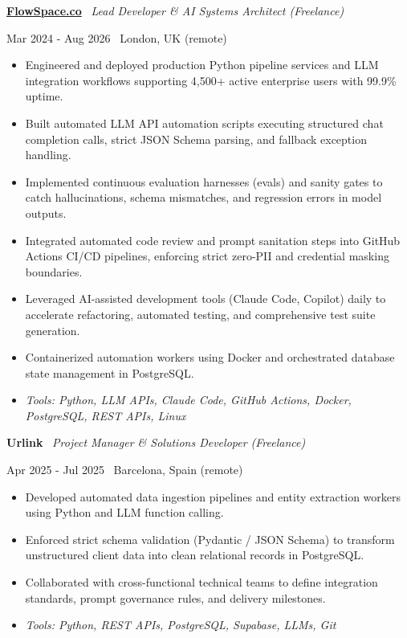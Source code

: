 \documentclass[a4paper,10pt]{article}
\newcommand{\role}[4]{%
  \vspace{2pt}\noindent
  \begin{minipage}[t]{0.70\textwidth}\raggedright\textbf{#1} \textbullet\ \textit{#3}\end{minipage}%
  \hfill
  \begin{minipage}[t]{0.28\textwidth}\raggedleft\footnotesize\color{gray}#2 \textbullet\ #4\end{minipage}%
  \vspace{1pt}%
}
\begin{document}
\role{\href{https://flowspace.co}{FlowSpace.co}}{Mar 2024 - Aug 2026}{Lead Developer \& AI Systems Architect (Freelance)}{London, UK (remote)}
\begin{itemize}
  \item Engineered and deployed production Python pipeline services and LLM integration workflows supporting 4,500+ active enterprise users with 99.9\% uptime.
  \item Built automated LLM API automation scripts executing structured chat completion calls, strict JSON Schema parsing, and fallback exception handling.
  \item Implemented continuous evaluation harnesses (evals) and sanity gates to catch hallucinations, schema mismatches, and regression errors in model outputs.
  \item Integrated automated code review and prompt sanitation steps into GitHub Actions CI/CD pipelines, enforcing strict zero-PII and credential masking boundaries.
  \item Leveraged AI-assisted development tools (Claude Code, Copilot) daily to accelerate refactoring, automated testing, and comprehensive test suite generation.
  \item Containerized automation workers using Docker and orchestrated database state management in PostgreSQL.
  \item \textit{Tools: Python, LLM APIs, Claude Code, GitHub Actions, Docker, PostgreSQL, REST APIs, Linux}
\end{itemize}

\role{Urlink}{Apr 2025 - Jul 2025}{Project Manager \& Solutions Developer (Freelance)}{Barcelona, Spain (remote)}
\begin{itemize}
  \item Developed automated data ingestion pipelines and entity extraction workers using Python and LLM function calling.
  \item Enforced strict schema validation (Pydantic / JSON Schema) to transform unstructured client data into clean relational records in PostgreSQL.
  \item Collaborated with cross-functional technical teams to define integration standards, prompt governance rules, and delivery milestones.
  \item \textit{Tools: Python, REST APIs, PostgreSQL, Supabase, LLMs, Git}
\end{itemize}
\end{document}
